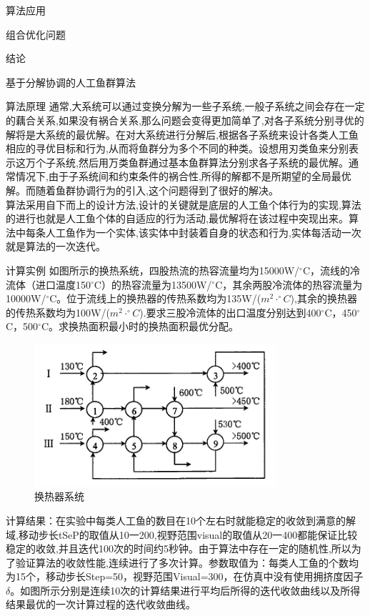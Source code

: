 \documentclass[UTF8]{ctexart}
\begin{document}
\begin{section}{算法应用}
\begin{subsection}{组合优化问题}
\begin{subsubsection}{结论}
\end{subsubsection}
\end{subsection}
\begin{subsection}{基于分解协调的人工鱼群算法}
\begin{subsubsection}{算法原理}
通常,大系统可以通过变换分解为一些子系统,一般子系统之间会存在一定的藕合关系,如果没有祸合关系,那么问题会变得更加简单了,对各子系统分别寻优的解将是大系统的最优解。在对大系统进行分解后,根据各子系统来设计各类人工鱼相应的寻优目标和行为,从而将鱼群分为多个不同的种类。设想用刃类鱼来分别表示这万个子系统,然后用万类鱼群通过基本鱼群算法分别求各子系统的最优解。通常情况下,由于子系统间和约束条件的祸合性,所得的解都不是所期望的全局最优解。而随着鱼群协调行为的引入,这个问题得到了很好的解决。\\
算法采用自下而上的设计方法,设计的关键就是底层的人工鱼个体行为的实现,算法的进行也就是人工鱼个体的自适应的行为活动,最优解将在该过程中突现出来。算法中每条人工鱼作为一个实体,该实体中封装着自身的状态和行为,实体每活动一次就是算法的一次迭代。
\end{subsubsection}
\begin{subsubsection}{计算实例}
如图所示的换热系统，四股热流的热容流量均为15000W/$^{\circ}$C，流线\uppercase\expandafter{}的冷流体（进口温度150$^{\circ}$C）的热容流量为13500W/$^{\circ}$C，其余两股冷流体的热容流量为10000W/$^{\circ}$C。位于流线\uppercase\expandafter{}上的换热器的传热系数均为135W/($m^2\cdot ^{\circ}C $),其余的换热器的传热系数均为100W/($m^2\cdot ^{\circ}C $).要求三股冷流体的出口温度分别达到400$^{\circ}$C，450$^{\circ}$C，500$^{\circ}$C。求换热面积最小时的换热面积最优分配。
\begin{figure}[H]
\centering
\includegraphics[width=0.8\textwidth]{../../pic/fish15.png}
\caption{换热器系统}
\end{figure}
计算结果：在实验中每类人工鱼的数目在10个左右时就能稳定的收敛到满意的解域,移动步长tSeP的取值从10一200,视野范围visual的取值从20一400都能保证比较稳定的收敛,并且迭代100次的时间约5秒钟。由于算法中存在一定的随机性,所以为了验证算法的收敛性能,连续进行了多次计算。参数取值为：每类人工鱼的个数均为15个，移动步长Step=50，视野范围Visual=300，在仿真中没有使用拥挤度因子$\delta$。如图所示分别是连续10次的计算结果进行平均后所得的迭代收敛曲线以及所得结果最优的一次计算过程的迭代收敛曲线。


\end{subsubsection}
\end{subsection}
\end{section}
\end{document}
